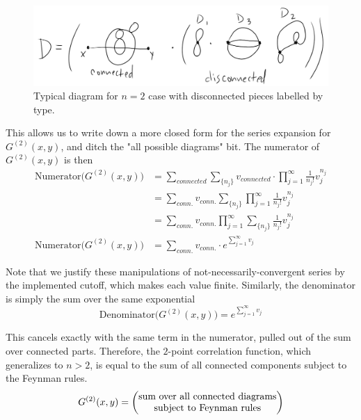 \begin{figure}[H]
	\centering
	\includegraphics[scale=0.4]{images/n2diagramslabel.png}
	\caption{Typical diagram for $n=2$ case with disconnected pieces labelled by type.}
\end{figure}

\noindent This allows us to write down a more closed form for the series expansion for $G^{(2)}(x,y)$, and ditch the "all possible diagrams" bit. The numerator of $G^{(2)}(x,y)$ is then
\begin{align}
\text{Numerator(}G^{(2)}(x,y)\text{)} &= \sum_{connected} \sum_{\{n_j\}} v_{connected} \cdot \prod_{j=1}^\infty \frac{1}{n_j !} v_j^{n_j} \\
&= \sum_{conn.} v_{conn.} \sum_{\{n_j\}} \prod_{j=1}^\infty \frac{1}{n_j !} v_j^{n_j} \\
&= \sum_{conn.} v_{conn.} \prod_{j=1}^\infty \sum_{\{n_j\}} \frac{1}{n_j !} v_j^{n_j}  \\
\text{Numerator(}G^{(2)}(x,y)\text{)} &= \sum_{conn.} v_{conn.} \cdot e^{\sum_{j=1}^{\infty} v_j}
\end{align}

\noindent Note that we justify these manipulations of not-necessarily-convergent series by the implemented cutoff, which makes each value finite. Similarly, the denominator is simply the sum over the same exponential
\begin{equation}
\text{Denominator(}G^{(2)}(x,y)\text{)} = e^{\sum_{j=1}^{\infty} v_j}
\end{equation}

\noindent This cancels exactly with the same term in the numerator, pulled out of the sum over connected parts. Therefore, the $2$-point correlation function, which generalizes to $n>2$, is equal to the sum of all connected components subject to the Feynman rules.
\begin{equation}
G^{(2)}(x,y) = \left(\stackanchor{sum over all connected diagrams}{subject to Feynman rules}\right)
\end{equation}

